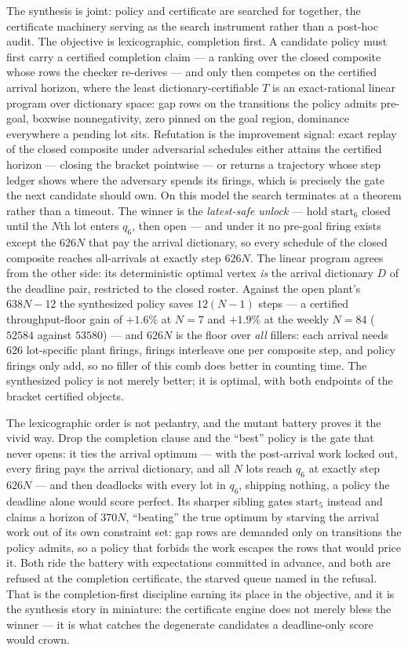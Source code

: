 The synthesis is joint: policy and certificate are searched for
together, the certificate machinery serving as the search
instrument rather than a post-hoc audit. The objective is
lexicographic, completion first. A candidate policy must first
carry a certified completion claim --- a ranking over the closed
composite whose rows the checker re-derives --- and only then
competes on the certified arrival horizon, where the least
dictionary-certifiable $T$ is an exact-rational linear program over
dictionary space: gap rows on the transitions the policy admits
pre-goal, boxwise nonnegativity, zero pinned on the goal region,
dominance everywhere a pending lot sits. Refutation is the
improvement signal: exact replay of the closed composite under
adversarial schedules either attains the certified horizon ---
closing the bracket pointwise --- or returns a trajectory whose
step ledger shows where the adversary spends its firings, which is
precisely the gate the next candidate should own. On this model the
search terminates at a theorem rather than a timeout. The winner is
the \emph{latest-safe unlock} --- hold $\mathrm{start}_6$ closed
until the $N$th lot enters $q_6$, then open --- and under it no
pre-goal firing exists except the $626N$ that pay the arrival
dictionary, so every schedule of the closed composite reaches
all-arrivals at exactly step $626N$. The linear program agrees from
the other side: its deterministic optimal vertex \emph{is} the
arrival dictionary $D$ of the deadline pair, restricted to the
closed roster. Against the open plant's $638N - 12$ the synthesized
policy saves $12(N-1)$ steps --- a certified throughput-floor gain
of $+1.6\%$ at $N = 7$ and $+1.9\%$ at the weekly $N = 84$ ($52584$
against $53580$) --- and $626N$ is the floor over \emph{all}
fillers: each arrival needs $626$ lot-specific plant firings,
firings interleave one per composite step, and policy firings only
add, so no filler of this comb does better in counting time. The
synthesized policy is not merely better; it is optimal, with both
endpoints of the bracket certified objects.

The lexicographic order is not pedantry, and the mutant battery
proves it the vivid way. Drop the completion clause and the
``best'' policy is the gate that never opens: it ties the arrival
optimum --- with the post-arrival work locked out, every firing
pays the arrival dictionary, and all $N$ lots reach $q_6$ at
exactly step $626N$ --- and then deadlocks with every lot in
$q_6$, shipping nothing, a policy the deadline alone would score
perfect. Its sharper sibling gates $\mathrm{start}_5$ instead and
claims a horizon of $370N$, ``beating'' the true optimum by
starving the arrival work out of its own constraint set: gap rows
are demanded only on transitions the policy admits, so a policy
that forbids the work escapes the rows that would price it. Both
ride the battery with expectations committed in advance, and both
are refused at the completion certificate, the starved queue named
in the refusal. That is the completion-first discipline earning its
place in the objective, and it is the synthesis story in miniature:
the certificate engine does not merely bless the winner --- it is
what catches the degenerate candidates a deadline-only score would
crown.

